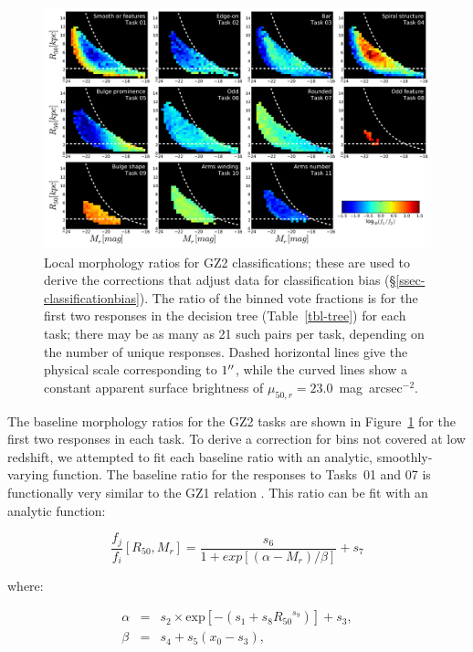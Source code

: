 \documentclass[useAMS,usenatbib]{mn2e}
\begin{document}
\begin{figure}
\includegraphics[angle=0,width=7.0in]{figures/gz2_baselines.pdf}
\caption{Local morphology ratios for GZ2 classifications; these are used to derive the corrections that adjust data for classification bias (\S\ref{ssec-classificationbias}). The ratio of the binned vote fractions is for the first two responses in the decision tree (Table~\ref{tbl-tree}) for each task; there may be as many as 21 such pairs per task, depending on the number of unique responses. Dashed horizontal lines give the physical scale corresponding to $1\hbox{$^{\prime\prime}$}$, while the curved lines show a constant apparent surface brightness of $\mu_{50,r}=23.0$~mag~arcsec$^{-2}$.
\label{fig-baselines}}
\end{figure}

The baseline morphology ratios for the GZ2 tasks are shown in Figure~\ref{fig-baselines} for the first two responses in each task. To derive a correction for bins not covered at low redshift, we attempted to fit each baseline ratio with an analytic, smoothly-varying function. The baseline ratio for the responses to Tasks~01 and 07 is functionally very similar to the GZ1 relation \citep[Figure~A5 in][]{bam09}. This ratio can be fit with an analytic function: 

\begin{equation}
\frac{f_j}{f_i}[R_{50},M_r] = \frac{s_6}{1 + exp[(\alpha - M_r)/\beta]} + s_7
\label{eqn-sb}
\end{equation}

\noindent where:

\begin{eqnarray}
\alpha &=& s_2\times\text{exp}[{-\left(s_1 + s_8{R_{50}}^{s_9}\right)}] + s_3, \\
\beta  &=& s_4 + s_5(x_0 - s_3),
\end{eqnarray}
\end{document}
